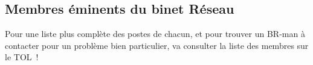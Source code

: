 
\subsection{Membres éminents du binet Réseau}









Pour une liste plus complète des postes de chacun, et pour trouver un BR-man à contacter pour un problème bien particulier, va consulter la liste des membres sur le TOL~!

